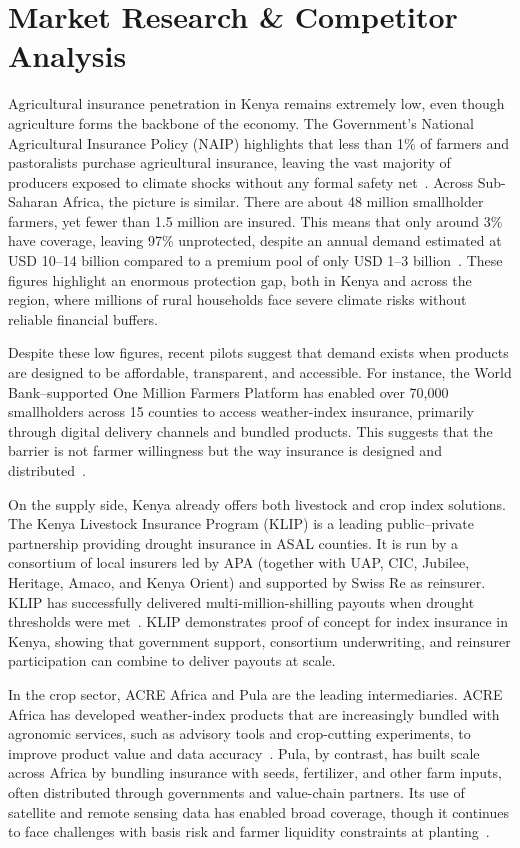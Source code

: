 \documentclass[11pt,a4paper]{article}
\begin{document}
    \section{Market Research \& Competitor Analysis}\label{sec:marketresearch}
    Agricultural insurance penetration in Kenya remains extremely low, even though agriculture forms the backbone of the economy.
    The Government's National Agricultural Insurance Policy (NAIP) highlights that less than 1\% of farmers and pastoralists purchase agricultural insurance, leaving the vast majority of producers exposed to climate shocks without any formal safety net~\parencite{MinistryOfAgriculture2023}.
    Across Sub-Saharan Africa, the picture is similar.
    There are about 48 million smallholder farmers, yet fewer than 1.5 million are insured.
    This means that only around 3\% have coverage, leaving 97\% unprotected, despite an annual demand estimated at USD 10--14 billion compared to a premium pool of only USD 1--3 billion~\parencite{ACREAfrica2020}.
    These figures highlight an enormous protection gap, both in Kenya and across the region, where millions of rural households face severe climate risks without reliable financial buffers.

    Despite these low figures, recent pilots suggest that demand exists when products are designed to be affordable, transparent, and accessible.
    For instance, the World Bank–supported One Million Farmers Platform has enabled over 70,000 smallholders across 15 counties to access weather-index insurance, primarily through digital delivery channels and bundled products.
    This suggests that the barrier is not farmer willingness but the way insurance is designed and distributed~\parencite{WorldBank2022}.

    On the supply side, Kenya already offers both livestock and crop index solutions.
    The Kenya Livestock Insurance Program (KLIP) is a leading public--private partnership providing drought insurance in ASAL counties.
    It is run by a consortium of local insurers led by APA (together with UAP, CIC, Jubilee, Heritage, Amaco, and Kenya Orient) and supported by Swiss Re as reinsurer.
    KLIP has successfully delivered multi-million-shilling payouts when drought thresholds were met~\parencite{Artemis2017, BASIS2017}.
    KLIP demonstrates proof of concept for index insurance in Kenya, showing that government support, consortium underwriting, and reinsurer participation can combine to deliver payouts at scale.

    In the crop sector, ACRE Africa and Pula are the leading intermediaries.
    ACRE Africa has developed weather-index products that are increasingly bundled with agronomic services, such as advisory tools and crop-cutting experiments, to improve product value and data accuracy~\parencite{ACREAfrica2024}.
    Pula, by contrast, has built scale across Africa by bundling insurance with seeds, fertilizer, and other farm inputs, often distributed through governments and value-chain partners.
    Its use of satellite and remote sensing data has enabled broad coverage, though it continues to face challenges with basis risk and farmer liquidity constraints at planting~\parencite{MunichReFoundation2022, UNSGSA2023}.
\end{document}
